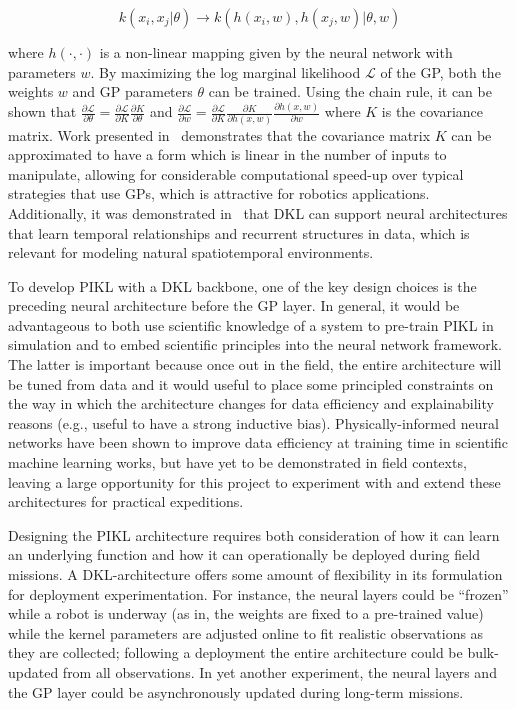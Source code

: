 \begin{equation}
	k(x_i, x_j | \theta) \longrightarrow k(h(x_i,w),h(x_j,w)|\theta,w)
\end{equation}

\noindent where $h(\cdot,\cdot)$ is a non-linear mapping given by the neural network with parameters $w$.
By maximizing the log marginal likelihood $\mathcal{L}$ of the GP, both the weights $w$ and GP parameters $\theta$ can be trained.
Using the chain rule, it can be shown that $\frac{\partial\mathcal{L}}{\partial\theta} = \frac{\partial\mathcal{L}}{\partial K}\frac{\partial K}{\partial \theta}$ and $\frac{\partial\mathcal{L}}{\partial w} = \frac{\partial\mathcal{L}}{\partial K}\frac{\partial K}{\partial h(x,w)}\frac{\partial h(x,w)}{\partial w}$ where $K$ is the covariance matrix.
Work presented in~\cite{wilson2015kernel} demonstrates that the covariance matrix $K$ can be approximated to have a form which is linear in the number of inputs to manipulate, allowing for considerable computational speed-up over typical strategies that use GPs, which is attractive for robotics applications.
Additionally, it was demonstrated in~\cite{al2017learning} that DKL can support neural architectures that learn temporal relationships and recurrent structures in data, which is relevant for modeling natural spatiotemporal environments.

To develop PIKL with a DKL backbone, one of the key design choices is the preceding neural architecture before the GP layer. In general, it would be advantageous to both use scientific knowledge of a system to pre-train PIKL in simulation and to embed scientific principles into the neural network framework. The latter is important because once out in the field, the entire architecture will be tuned from data and it would useful to place some principled constraints on the way in which the architecture changes for data efficiency and explainability reasons (e.g., useful to have a strong inductive bias). Physically-informed neural networks\autocite{raissi2019physics,lu2020extracting,mohan2019compressed} have been shown to improve data efficiency at training time in scientific machine learning works, but have yet to be demonstrated in field contexts, leaving a large opportunity for this project to experiment with and extend these architectures for practical expeditions. 

Designing the PIKL architecture requires both consideration of how it can learn an underlying function and how it can operationally be deployed during field missions. A DKL-architecture offers some amount of flexibility in its formulation for deployment experimentation. For instance, the neural layers could be ``frozen'' while a robot is underway (as in, the weights are fixed to a pre-trained value) while the kernel parameters are adjusted online to fit realistic observations as they are collected; following a deployment the entire architecture could be bulk-updated from all observations. In yet another experiment, the neural layers and the GP layer could be asynchronously updated during long-term missions. 

